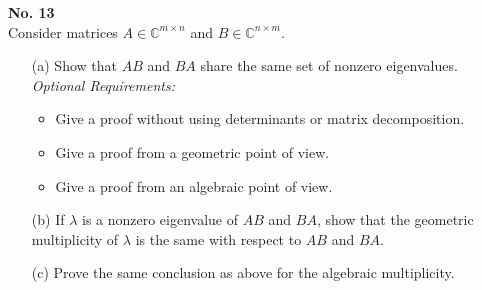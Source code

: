 \documentclass[a4paper, 11pt]{article}
\newenvironment{problem}[2][No.]
    { \begin{mdframed}[backgroundcolor=gray!5] \textbf{#1 #2} \\}
    {  \end{mdframed}}
\begin{document}
\begin{problem}{13}
	Consider matrices \( A \in \mathbb{C}^{m \times n} \) and \( B \in \mathbb{C}^{n \times m} \).
	\begin{enumerate}
		\item[(a)] Show that \( AB \) and \( BA \) share the same set of nonzero eigenvalues.
		\textit{Optional Requirements:}
		\begin{itemize}
			\item Give a proof without using determinants or matrix decomposition.
			\item Give a proof from a geometric point of view.
			\item Give a proof from an algebraic point of view.
		\end{itemize}
		\item[(b)] If \( \lambda \) is a nonzero eigenvalue of \( AB \) and \( BA \), show that the geometric multiplicity of \( \lambda \) is the same with respect to \( AB \) and \( BA \).
		\item[(c)] Prove the same conclusion as above for the algebraic multiplicity.
	\end{enumerate}
\end{problem}
\end{document}

